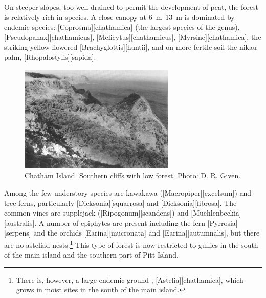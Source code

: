 On steeper slopes, too well drained to permit the development of peat, the forest is relatively rich in species.
A close canopy at \SIrange{6}{13}{\metre} is dominated by endemic species: [Coprosma][chathamica] (the largest species of the genus), [Pseudopanax][chathamicus], [Melicytus][chathamicus], [Myrsine][chathamica], the striking yellow-flowered [Brachyglottis][huntii], and on more fertile soil the nikau palm, [Rhopalostylis][sapida].

\begin{figure}
	\includegraphics[width=0.66\textwidth]{graphics/figure118chatham-island.jpg}
	\centering
	\caption[Chatham Island, southern cliffs]{Chatham Island.
	Southern cliffs with low forest.
	Photo: D. R. Given.}%
	\label{fig:118chatham-island}
\end{figure}

Among the few understory species are kawakawa ([Macropiper][excelsum]) and tree ferns, particularly [Dicksonia][squarrosa] and [Dicksonia][fibrosa].
The common vines are supplejack ([Ripogonum][scandens]) and [Muehlenbeckia][australis].
A number of epiphytes are present including the fern [Pyrrosia][serpens] and the orchids [Earina][mucronata] and [Earina][autumnalis], but there are no asteliad nests.\footnote{There is, however, a large endemic ground , [Astelia][chathamica], which grows in moist sites in the south of the main island.}
This type of forest is now restricted to gullies in the south of the main island and the southern part of Pitt Island.

